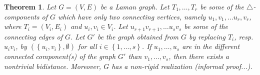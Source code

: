 \documentclass[a4paper, 11pt]{article}
\newcommand{\trcomps}{$\triangle$-components}
\newtheorem{thm}{Theorem}[section]
\theoremstyle{definition}
\begin{document}
\begin{thm}
\label{thm:cutToTwoParts}
Let $G=(V,E)$ be a Laman graph. Let  $T_1, \dots, T_r$ be some of the \trcomps{} of $G$ which have only two connecting vertices, namely $u_1, v_1, \dots u_r,v_r$, where  $T_i=(V_i,E_i)$ and $u_i, v_i\in V_i$. Let  $u_{r+1}v_{r+1}, \dots u_s v_s$ be some of the connecting edges of $G$. Let $G'$ be the graph obtained from $G$ by replacing $T_i$, resp. $u_iv_i$, by $(\left\{u_i, v_i\right\}, \emptyset)$ for all $i\in \left\{1, \dots, s\right\}$.
If $u_1, \dots, u_s$ are in the different connected component(s) of the graph $G'$ than $v_1, \dots, v_s$, then there exists a nontrivial bidistance.  Moreover, $G$ has a non-rigid realization (informal proof...).
\end{thm}
\end{document}
